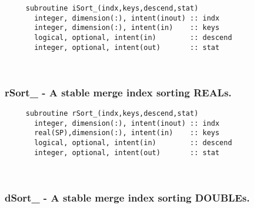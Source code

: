 \begin{verbatim} 
     subroutine iSort_(indx,keys,descend,stat)
       integer, dimension(:), intent(inout) :: indx
       integer, dimension(:), intent(in)    :: keys
       logical, optional, intent(in)        :: descend
       integer, optional, intent(out)       :: stat
 \end{verbatim}%
 
 
\mbox{}\hrulefill\ 
 

  \subsubsection{rSort\_ - A stable merge index sorting REALs.}

\begin{verbatim} 
     subroutine rSort_(indx,keys,descend,stat)
       integer, dimension(:), intent(inout) :: indx
       real(SP),dimension(:), intent(in)    :: keys
       logical, optional, intent(in)        :: descend
       integer, optional, intent(out)       :: stat
 \end{verbatim}%
 
 
\mbox{}\hrulefill\ 
 
  \subsubsection{dSort\_ - A stable merge index sorting DOUBLEs.}

